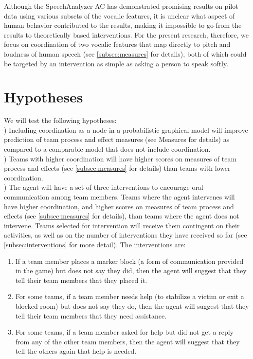 Although the SpeechAnalyzer AC has demonstrated promising results on pilot data
using various subsets of the vocalic features, it is unclear what aspect of
human behavior contributed to the results, making it impossible to go from the
results to theoretically based interventions. For the present research,
therefore, we focus on coordination of two vocalic features that map directly
to pitch and loudness of human speech (see \autoref{subsec:measures} for
details), both of which could be targeted by an intervention as simple as
asking a person to speak softly. 


\section{Hypotheses}

We will test the following hypotheses:\\

) Including coordination as a node in a probabilistic graphical
model will improve prediction of team process and effect measures (see Measures
for details)  as compared to a comparable model that does not include
coordination.\\

) Teams with higher coordination will have higher scores on measures
of team process and effects (see \autoref{subsec:measures} for details) than
teams with lower coordination.\\

) The agent will have a set of three interventions to encourage oral
communication among team members. Teams where the agent intervenes will have
higher coordination, and higher scores on measures of team process and effects
(see \autoref{subsec:measures} for details), than teams where the agent does
not intervene.  Teams selected for intervention will receive them contingent on
their activities, as well as on the number of interventions they have received
so far (see \autoref{subsec:interventions} for more detail).  The interventions
are:

\begin{enumerate}

    \item If a team member places a marker block (a form of communication
        provided in the game) but does not say they did, then the agent
        will suggest that they tell their team members that they placed it. 

    \item For some teams, if a team member needs help (to stabilize a
        victim or exit a blocked room) but does not say they do, then the
        agent will suggest that they tell their team members that they need
        assistance. 

    \item For some teams, if a team member asked for help but did not get a
        reply from any of the other team members, then the agent will
        suggest that they tell the others again that help is needed. 

\end{enumerate}


